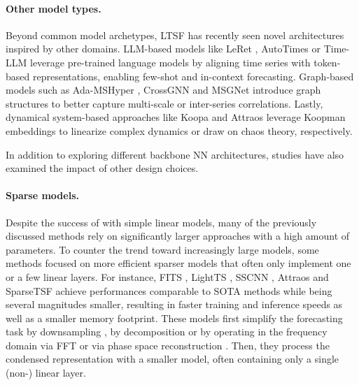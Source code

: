 \documentclass[a4paper,oneside,bibliography=totoc]{scrbook}
\begin{document}
\paragraph{Other model types.}
Beyond common model archetypes, LTSF has recently seen novel architectures inspired by other domains. 
LLM-based models like LeRet \cite{huang_leret_2024}, AutoTimes \cite{liu_autotimes_2024} or Time-LLM \cite{jin_time-llm_2023} leverage pre-trained language models by aligning time series with token-based representations, enabling few-shot and in-context forecasting. 
Graph-based models such as Ada-MSHyper \cite{shang_ada-mshyper_2024}, CrossGNN \cite{huang_crossgnn_2023} and MSGNet \cite{cai_msgnet_2024} introduce graph structures to better capture multi-scale or inter-series correlations. %
Lastly, dynamical system-based approaches like Koopa \cite{liu_koopa_2023} and Attraos \cite{hu_attractor_2024} leverage Koopman embeddings to linearize complex dynamics or draw on chaos theory, respectively.
\newline

\noindent
In addition to exploring different backbone NN architectures, studies have also examined the impact of other design choices.

\paragraph{Sparse models.}
Despite the success of \citet{zeng_are_2023} with simple linear models, many of the previously discussed methods rely on significantly larger approaches with a high amount of parameters. 
To counter the trend toward increasingly large models, some methods focused on more efficient sparser models that often only implement one or a few linear layers. For instance, FITS \cite{xu_fits_2023}, LightTS \cite{zhang_less_2022}, SSCNN \cite{deng_parsimony_2024}, Attraos \cite{hu_attractor_2024} and SparseTSF \cite{lin_sparsetsf_2024} achieve performances comparable to SOTA methods while being several magnitudes smaller, resulting in faster training and inference speeds as well as a smaller memory footprint.  
These models first simplify the forecasting task by downsampling \cite{lin_sparsetsf_2024, zhang_less_2022}, by decomposition \cite{deng_parsimony_2024} or by operating in the frequency domain via FFT \cite{xu_fits_2023} or via phase space reconstruction \cite{hu_attractor_2024}. Then, they process the condensed representation with a smaller model, often containing only a single (non-) linear layer.
\end{document}

